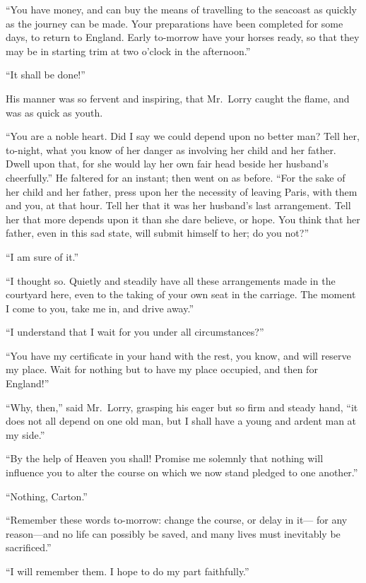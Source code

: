 ``You have money, and can buy the means of travelling to the seacoast
as quickly as the journey can be made.  Your preparations have been
completed for some days, to return to England.  Early to-morrow have
your horses ready, so that they may be in starting trim at two o'clock
in the afternoon.''

``It shall be done!''

His manner was so fervent and inspiring, that Mr.\ Lorry caught the
flame, and was as quick as youth.

``You are a noble heart.  Did I say we could depend upon no better man?
Tell her, to-night, what you know of her danger as involving her
child and her father.  Dwell upon that, for she would lay her own
fair head beside her husband's cheerfully.''  He faltered for an instant;
then went on as before.  ``For the sake of her child and her father,
press upon her the necessity of leaving Paris, with them and you,
at that hour.  Tell her that it was her husband's last arrangement.
Tell her that more depends upon it than she dare believe, or hope.
You think that her father, even in this sad state, will submit
himself to her; do you not?''

``I am sure of it.''

``I thought so.  Quietly and steadily have all these arrangements made
in the courtyard here, even to the taking of your own seat in the
carriage. The moment I come to you, take me in, and drive away.''

``I understand that I wait for you under all circumstances?''

``You have my certificate in your hand with the rest, you know,
and will reserve my place.  Wait for nothing but to have my place
occupied, and then for England!''

``Why, then,'' said Mr.\ Lorry, grasping his eager but so firm and
steady hand, ``it does not all depend on one old man, but I shall have
a young and ardent man at my side.''

``By the help of Heaven you shall!  Promise me solemnly that nothing
will influence you to alter the course on which we now stand pledged
to one another.''

``Nothing, Carton.''

``Remember these words to-morrow:  change the course, or delay in it---%
for any reason---and no life can possibly be saved, and many lives
must inevitably be sacrificed.''

``I will remember them.  I hope to do my part faithfully.''


